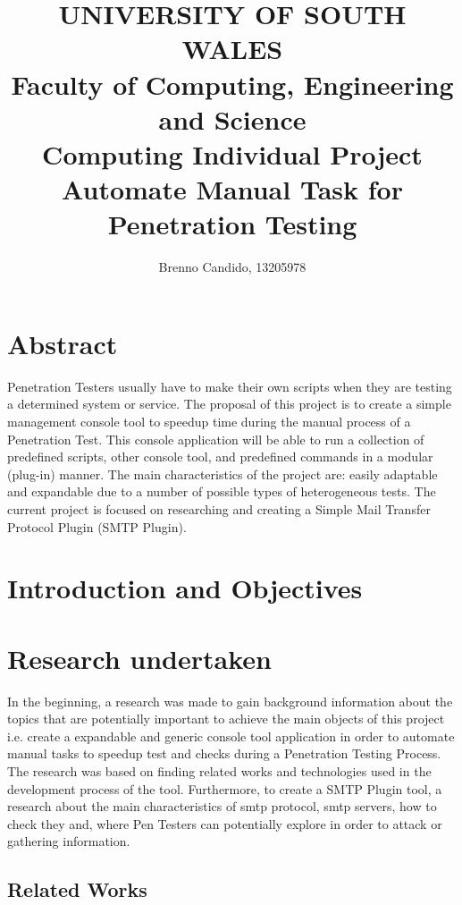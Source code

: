\documentclass[a4paper, 12pt]{article}
\title {
			{\LARGE{\textbf{UNIVERSITY OF SOUTH WALES}}}\\
			{\large{\textsf{Faculty of Computing, Engineering and Science}}}\\
			{\large{\textsf{Computing Individual Project}}}\\
			\vspace{2.0cm}
			{\LARGE{\textbf{Automate Manual Task for Penetration Testing}}}
			\vspace{2.0cm}
}
\author { Brenno Candido, 13205978 } %
\begin{document}
\maketitle \clearpage

\tableofcontents \clearpage

\section{Abstract}

	Penetration Testers usually have to make their own scripts when they are testing a determined system or service. The proposal of this project is to
create a simple management console tool to speedup time during the manual process of a Penetration Test. This console application will be able to run a
collection of predefined scripts, other console tool, and predefined commands in a modular (plug-in) manner. The main characteristics of the project
are: easily adaptable and expandable due to a number of possible types of heterogeneous tests. The current project is focused on researching and
creating a Simple Mail Transfer Protocol Plugin (SMTP Plugin).\\

\clearpage

\section{Introduction and Objectives}

\section{Research undertaken}

In the beginning, a research was made to gain background information about the topics that are potentially important to achieve the main objects of this project i.e. create a expandable and generic console tool application in order to automate manual tasks to speedup test and checks during a Penetration Testing Process. The research was based on finding related works and technologies used in the development process of the tool. Furthermore, to create a SMTP Plugin tool, a research about the main characteristics of smtp protocol, smtp servers, how to check they and, where Pen Testers can potentially explore in order to attack or gathering information.

\subsection{Related Works}
\end{document}
